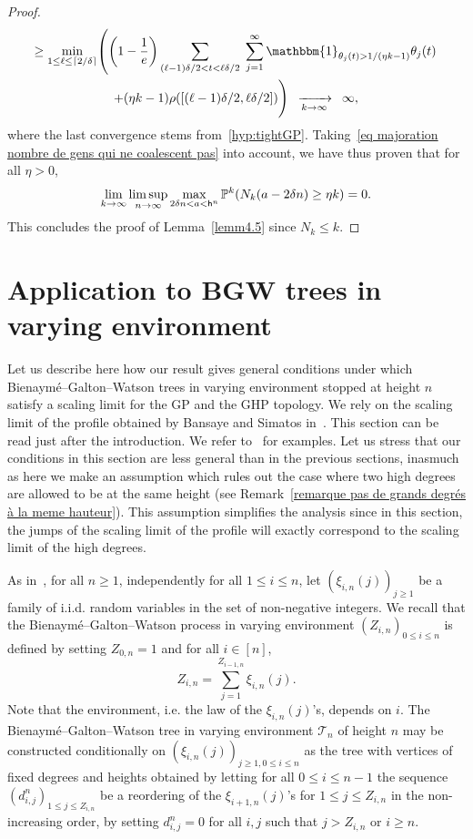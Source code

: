 \documentclass[AHL,Unicode,published]{cedram}
\newcommand{\cv}[1][n]{\enskip\xrightarrow[#1 \to \infty]{}\enskip}
\renewcommand{\P}{{\mathbb{P}}}
\newcommand{\1}{\mathbbm{1}}
\newcommand{\T}{\mathcal{T}}
\newcommand{\h}{\mathsf{h}}
\let\originalleft\left
\let\originalright\right
\renewcommand{\left}{\mathopen{}\mathclose\bgroup\originalleft}
\renewcommand{\right}{\aftergroup\egroup\originalright}
\renewcommand*{\to}{\mathchoice{\longrightarrow}{\rightarrow}{\rightarrow}{\rightarrow}}
\begin{document}
\begin{proof}
\begin{multline*}
\ge \min_{1 \le \ell \le \lceil 2/\delta \rceil}
\left(\left(1-\frac{1}{e} \right) \sum_{(\ell-1) \delta/2 < t < \ell \delta/2} \;\sum_{j=1}^\infty \1_{\theta_j(t)>1/(\eta k-1)} \theta_j(t)\right.\\
+ (\eta k-1) \rho([(\ell-1)\delta/2, \ell \delta/2])
\Biggr)\cv[k] \infty,
\end{multline*}
where the last convergence stems from~\ref{hyp:tightGP}. Taking~\eqref{eq majoration nombre de gens qui ne coalescent pas} into account, we have thus proven that for all $\eta>0$,
\[
\lim_{k\to \infty} \limsup_{n \to \infty} \max_{2 \delta n <a < \h^n} \P^k(N_k(a-2\delta n) \ge \eta k) = 0.
\]
This concludes the proof of Lemma~\ref{lemm4.5} since $N_k \le k$.
\end{proof}

\section{Application to BGW trees in varying environment} \label{sec:appBGWTVE}

Let us describe here how our result gives general conditions under which Bienaymé--Galton--Watson trees in varying environment stopped at height $n$ satisfy a scaling limit for the GP and the GHP topology. We rely on the scaling limit of the profile obtained by Bansaye and Simatos in~\cite{BS15}. This section can be read just after the introduction. We refer to~\cite{BS15} for examples. {Let us stress that our conditions in this section are less general than in the previous sections, inasmuch as here we make an assumption which rules out the case where two high degrees are allowed to be at the same height (see Remark~\ref{remarque pas de grands degrés à la meme hauteur}). This assumption simplifies the analysis since in this section, the jumps of the scaling limit of the profile will exactly correspond to the scaling limit of the high degrees.}

As in~\cite{BS15}, for all $n \ge 1$, independently for all $1 \le i \le n$, let $(\xi_{i,n}(j))_{j\ge 1}$ be a family of i.i.d. random variables in the set of non-negative integers. We recall that the Bienaymé--Galton--Watson process in varying environment $(Z_{i,n})_{0 \le i \le n}$ is defined by setting $Z_{0,n}=1$ and for all $i \in [n]$,
\[
Z_{i,n} = \sum_{j=1}^{Z_{i-1,n}} \xi_{i,n}(j).
\]
Note that the environment, i.e. the law of the $\xi_{i,n}(j)$'s, depends on $i$. The Bienaymé--Galton--Watson tree in varying environment $\T_n$ of height $n$ may be constructed conditionally on $(\xi_{i,n}(j))_{j\ge 1, 0 \le i \le n}$ as the tree with vertices of fixed degrees and heights obtained by letting for all $0 \le i\le n-1$ the sequence $(d_{i,j}^n)_{1 \le j \le Z_{i,n}}$ be a reordering of the $\xi_{i+1,n}(j)$'s for $1 \le j \le Z_{i,n}$ in the non-increasing order, by setting $d^n_{i,j}=0$ {for all $i,j$ such that} $j > Z_{i,n}$ or $i \ge n$.
\end{document}
